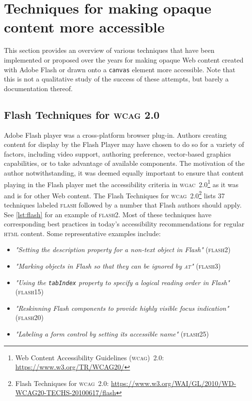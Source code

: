 \documentclass[sigconf]{acmart}
\begin{document}
\section{Techniques for making opaque content more accessible}

This section provides an overview of various techniques that have been implemented or proposed over the years for making opaque Web content created with Adobe Flash or drawn onto a \texttt{canvas} element more accessible. Note that this is not a qualitative study of the success of these attempts, but barely a documentation thereof.

\subsection{Flash Techniques for \textsc{wcag} 2.0}

Adobe Flash player was a cross-platform browser plug-in. Authors creating content for display by the Flash Player may have chosen to do so for a variety of factors, including video support, authoring preference, vector-based graphics capabilities, or to take advantage of available components. The motivation of the author notwithstanding, it was deemed equally important to ensure that content playing in the Flash player met the accessibility criteria in \textsc{wgac}\ 2.0\footnote{Web Content Accessibility Guidelines (\textsc{wcag})\ 2.0: \url{https://www.w3.org/TR/WCAG20/}} as it was and is for other Web content. The Flash Techniques for \textsc{wcag}\ 2.0\footnote{Flash Techniques for \textsc{wcag}\ 2.0: \url{https://www.w3.org/WAI/GL/2010/WD-WCAG20-TECHS-20100617/flash}} lists 37 techniques labeled \textsc{flash} followed by a number that Flash authors 
should apply. See \autoref{lst:flash} for an example of \textsc{flash}2. Most of these techniques have corresponding best practices in today's accessibility recommendations for regular \textsc{html} content. Some representative examples include:

\begin{itemize}
  \item \textit{"Setting the description property for a non-text object in Flash"} (\textsc{flash}2)
  \item \textit{"Marking objects in Flash so that they can be ignored by \textsc{at}"} (\textsc{flash}3)
  \item \textit{"Using the \texttt{tabIndex} property to specify a logical reading order in Flash"} (\textsc{flash}15)
  \item \textit{"Reskinning Flash components to provide highly visible focus indication"} (\textsc{flash}20)
  \item \textit{"Labeling a form control by setting its accessible name"} (\textsc{flash}25)
\end{itemize}
\end{document}
